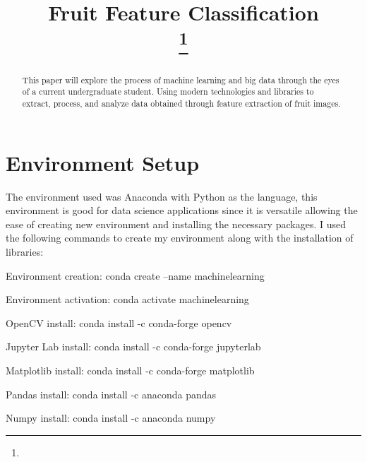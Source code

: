 \documentclass[conference]{IEEEtran}
\begin{document}
\title{Fruit Feature Classification\\
{\footnotesize \textsuperscript{}}
\thanks{}
}

\author{
}

\maketitle

\begin{abstract}
This paper will explore the process of machine learning and big data through the eyes of a current undergraduate student. Using modern technologies and libraries to extract, process, and analyze data obtained through feature extraction of fruit images.
\end{abstract}

\section{Environment Setup}
The environment used was Anaconda with Python as the language, this environment is good for data science applications since it is versatile allowing the ease of creating new environment and installing the necessary packages. I used the following commands to create my environment along with the installation of libraries:

Environment creation: 
conda create --name machinelearning

Environment activation:
conda activate machinelearning

OpenCV install:
conda install -c conda-forge opencv

Jupyter Lab install:
conda install -c conda-forge jupyterlab

Matplotlib install:
conda install -c conda-forge matplotlib

Pandas install:
conda install -c anaconda pandas

Numpy install:
conda install -c anaconda numpy
\end{document}
